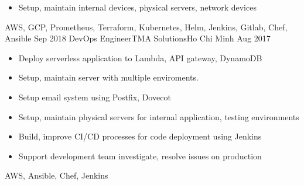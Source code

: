 \begin{experiences}
{\begin{itemize}
                        \item Setup, maintain internal devices, physical servers, network devices
                      \end{itemize}
                    }
                    {AWS, GCP, Prometheus, Terraform, Kubernetes, Helm, Jenkins, Gitlab, Chef, Ansible}
  \emptySeparator
  \experience
    {Sep 2018} {DevOps Engineer}{TMA Solutions}{Ho Chi Minh}
    {Aug 2017}    {
                      \begin{itemize}
                        \item Deploy serverless application to Lambda, API gateway, DynamoDB
                        \item Setup, maintain server with multiple enviroments.
                        \item Setup email system using Postfix, Dovecot
                        \item Setup, maintain physical servers for internal application, testing environments
                        \item Build, improve CI/CD processes for code deployment using Jenkins
                        \item Support development team investigate, resolve issues on production
                      \end{itemize}
                    }
                    {AWS, Ansible, Chef, Jenkins}
  \emptySeparator
\end{experiences}